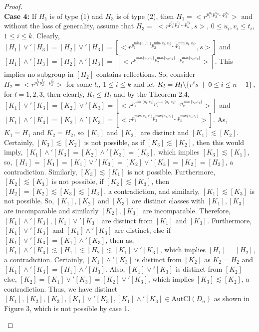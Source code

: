 \documentclass{article}
\theoremstyle{definition}
\begin{document}
\begin{proof}
\vspace{0.2cm} \\
\textbf{Case 4:} If $H_1$ is of type (1) and $H_3$ is of type (2), then $H_1=\bigl<r^{p_1^{u_1}p_2^{u_2}\dots p_k^{u_k}}\bigr>$ and without the loss of generality, assume that $H_3=$ $\bigl<r^{p_1^{v_1}p_2^{v_2}\dots p_k^{v_k}},s\bigr>$, $0\le u_i,v_i\le t_i$, $1\le i\le k$. Clearly, $[H_1]\vee' [H_3]=[H_2]\vee' [H_3]= [\bigl<r^{p_1^{\text{min}\{u_1,v_1\}}p_2^{\text{min}\{u_2,v_2\}}\dots p_k^{\text{min}\{u_k,v_k\}}},s\bigr>]$ and $[H_1]\wedge' [H_3]=[H_2]\wedge' [H_3]=$ 
$[\bigl<r^{p_1^{\text{max}\{u_1,v_1\}}p_2^{\text{max}\{u_2,v_2\}}\dots p_k^{\text{max}\{u_k,v_k\}}}\bigr>]$. This implies no subgroup in $[H_2]$ contains reflections. So, consider $H_2=\bigl<r^{p_1^{l_1}p_2^{l_2}\dots p_k^{l_k}}\bigr>$ for some $l_i$, $1\le i\le k$ and let $K_l=H_l \backslash \{r^is\hspace{0.2cm}|\hspace{0.2cm} 0\le i \le n-1\} $, for $l=1,2,3$, then clearly, $K_l\le H_l$ and by the Theorem 2.4, $[K_1]\vee' [K_3]=[K_2]\vee'[K_3]=[\bigl<r^{p_1^{\min\{u_1,v_1\}}p_2^{\min\{u_2,v_2\}}\dots p_k^{\min\{u_k,v_k\}}}\bigr>]$ and $[K_1]\wedge' [K_3]=[K_2]\wedge'[K_3]=[\bigl<r^{p_1^{\text{max}\{u_1,v_1\}}p_2^{\text{max}\{u_2,v_2\}}\dots p_k^{\text{max}\{u_k,v_k\}}}\bigr>]$. As, $K_1=H_1$ and $K_2=H_2$, so $[K_1]$ and $[K_2]$ are distinct and $[K_1]\lesssim[K_2]$. Certainly, $[K_3]\lesssim[K_2]$ is not possible, as if $[K_3]\lesssim [K_2]$, then this would imply, $[K_1]\wedge'[K_3]=[K_2]\wedge'[K_3]=[K_3]$, which implies $[K_3]\lesssim [K_1]$, so, $[H_1]=[K_1]=[K_1]\vee'[K_3]=[K_2]\vee'[K_3]=[K_2]=[H_2]$, a contradiction. Similarly, $[K_3]\lesssim [K_1]$ is not possible. Furthermore, $[K_2]\lesssim [K_3]$ is not possible, if $[K_2]\lesssim [K_3]$, then $[H_2]=[K_2]\lesssim[K_3]\lesssim [H_3]$, a contradiction, and similarly, $[K_1]\lesssim [K_3]$ is not possible. So, $[K_1],[K_2]$ and $[K_3]$ are distinct classes with $[K_1],[K_3]$ are incomparable and similarly $[K_2],[K_3]$ are incomparable. Therefore, $[K_1]\wedge'[K_3],[K_1]\vee'[K_3]$ are distinct from $[K_1]$ and $[K_3]$. Furthermore, $[K_1]\vee'[K_3]$ and $[K_1]\wedge'[K_3]$ are distinct, else if 
$[K_1]\vee'[K_3]=[K_1]\wedge'[K_3]$, then as, $[K_1]\wedge'[K_3]\lesssim[H_1]\lesssim[H_2]\lesssim[K_1]\vee'[K_3]$, which implies $[H_1]=[H_2]$, a contradiction. Certainly, $[K_1]\wedge'[K_3]$ is distinct from $[K_2]$ as $K_2=H_2$ and $[K_1]\wedge'[K_3]=[H_1]\wedge'[H_3]$. Also, $[K_1]\vee'[K_3]$ is distinct from $[K_2]$ else, $[K_2]=[K_1]\vee'[K_3]=[K_2]\vee'[K_3]$, which implies $[K_3]\lesssim [K_2]$, a contradiction. Thus, we have distinct $[K_1],[K_2],[K_3],[K_1]\vee'[K_3],[K_1]\wedge' [K_3]\in \text{AutCl}(D_n)$ as shown in Figure 3, which is not possible by case 1. 
\begin{figure}[h!]
    \centering
    \begin{tikzpicture}[scale=1.5,  every node/.style={circle, fill=black, minimum size=6pt, inner sep=0pt}]
				

\end{tikzpicture}
\end{figure}
\end{proof}
\end{document}

